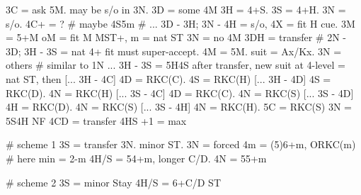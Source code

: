 3C = ask 5M. may be s/o in 3N.
    3D = some 4M
        3H = 4+S. 3S = 4+H. 3N = s/o. 4C+ = ?  # maybe 4S5m
        # ... 3D - 3H; 3N - 4H = s/o, 4X = fit H cue.
    3M = 5+M
        oM = fit M MST+, m = nat ST
    3N = no 4M
3DH = transfer  # 2N - 3D; 3H - 3S = nat
    4+ fit must super-accept. 4M = 5M. suit = Ax/Kx. 3N = others  # similar to 1N
    ... 3H - 3S = 5H4S
    after transfer, new suit at 4-level = nat ST, then
        [... 3H - 4C] 4D = RKC(C). 4S = RKC(H)
        [... 3H - 4D] 4S = RKC(D). 4N = RKC(H)
        [... 3S - 4C] 4D = RKC(C). 4N = RKC(S)
        [... 3S - 4D] 4H = RKC(D). 4N = RKC(S)
        [... 3S - 4H] 4N = RKC(H). 5C = RKC(S)
3N = 5S4H NF
4CD = transfer 4HS
    +1 = max

# scheme 1
3S = transfer 3N. minor ST.
    3N = forced
        4m = (5)6+m, ORKC(m)  # here min = 2-m
        4H/S = 54+m, longer C/D. 4N = 55+m

# scheme 2
3S = minor Stay
4H/S = 6+C/D ST
